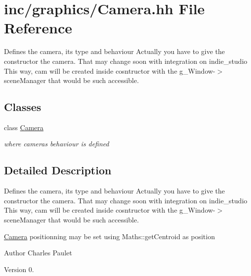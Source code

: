 \hypertarget{Camera_8hh}{}\section{inc/graphics/\+Camera.hh File Reference}
\label{Camera_8hh}


Defines the camera, its type and behaviour  Actually you have to give the constructor the camera. That may change soon with integration on indie\+\_\+studio This way, cam will be created inside cosntructor with the g\+\_\+\+Window-\/$>$scene\+Manager that would be such accessible.  


\subsection*{Classes}
\begin{DoxyCompactItemize}
\item 
class \hyperlink{classCamera}{Camera}
\begin{DoxyCompactList}\small\item\em where cameras behaviour is defined \end{DoxyCompactList}\end{DoxyCompactItemize}


\subsection{Detailed Description}
Defines the camera, its type and behaviour  Actually you have to give the constructor the camera. That may change soon with integration on indie\+\_\+studio This way, cam will be created inside cosntructor with the g\+\_\+\+Window-\/$>$scene\+Manager that would be such accessible. 

\hyperlink{classCamera}{Camera} positionning may be set using Maths\+::get\+Centroid as position

\begin{DoxyAuthor}{Author}
Charles Paulet 
\end{DoxyAuthor}
\begin{DoxyVersion}{Version}
0. 
\end{DoxyVersion}

